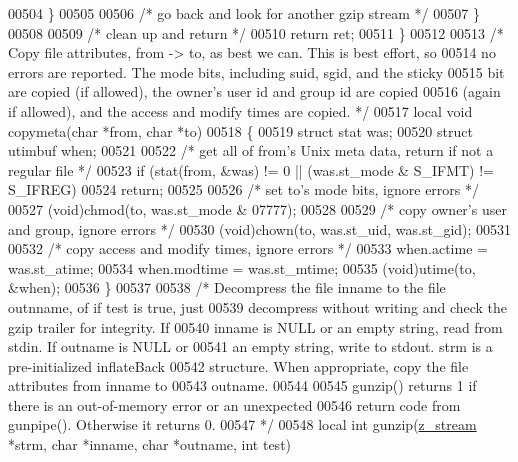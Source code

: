 \begin{DoxyCode}
00504         \}
00505 
00506         \textcolor{comment}{/* go back and look for another gzip stream */}
00507     \}
00508 
00509     \textcolor{comment}{/* clean up and return */}
00510     \textcolor{keywordflow}{return} ret;
00511 \}
00512 
00513 \textcolor{comment}{/* Copy file attributes, from -> to, as best we can.  This is best effort, so}
00514 \textcolor{comment}{   no errors are reported.  The mode bits, including suid, sgid, and the sticky}
00515 \textcolor{comment}{   bit are copied (if allowed), the owner's user id and group id are copied}
00516 \textcolor{comment}{   (again if allowed), and the access and modify times are copied. */}
00517 local \textcolor{keywordtype}{void} copymeta(\textcolor{keywordtype}{char} *from, \textcolor{keywordtype}{char} *to)
00518 \{
00519     \textcolor{keyword}{struct }stat was;
00520     \textcolor{keyword}{struct }utimbuf when;
00521 
00522     \textcolor{comment}{/* get all of from's Unix meta data, return if not a regular file */}
00523     \textcolor{keywordflow}{if} (stat(from, &was) != 0 || (was.st\_mode & S\_IFMT) != S\_IFREG)
00524         \textcolor{keywordflow}{return};
00525 
00526     \textcolor{comment}{/* set to's mode bits, ignore errors */}
00527     (void)chmod(to, was.st\_mode & 07777);
00528 
00529     \textcolor{comment}{/* copy owner's user and group, ignore errors */}
00530     (void)chown(to, was.st\_uid, was.st\_gid);
00531 
00532     \textcolor{comment}{/* copy access and modify times, ignore errors */}
00533     when.actime = was.st\_atime;
00534     when.modtime = was.st\_mtime;
00535     (void)utime(to, &when);
00536 \}
00537 
00538 \textcolor{comment}{/* Decompress the file inname to the file outnname, of if test is true, just}
00539 \textcolor{comment}{   decompress without writing and check the gzip trailer for integrity.  If}
00540 \textcolor{comment}{   inname is NULL or an empty string, read from stdin.  If outname is NULL or}
00541 \textcolor{comment}{   an empty string, write to stdout.  strm is a pre-initialized inflateBack}
00542 \textcolor{comment}{   structure.  When appropriate, copy the file attributes from inname to}
00543 \textcolor{comment}{   outname.}
00544 \textcolor{comment}{}
00545 \textcolor{comment}{   gunzip() returns 1 if there is an out-of-memory error or an unexpected}
00546 \textcolor{comment}{   return code from gunpipe().  Otherwise it returns 0.}
00547 \textcolor{comment}{ */}
00548 local \textcolor{keywordtype}{int} gunzip(\hyperlink{structz__stream__s}{z\_stream} *strm, \textcolor{keywordtype}{char} *inname, \textcolor{keywordtype}{char} *outname, \textcolor{keywordtype}{int} test)

\end{DoxyCode}
